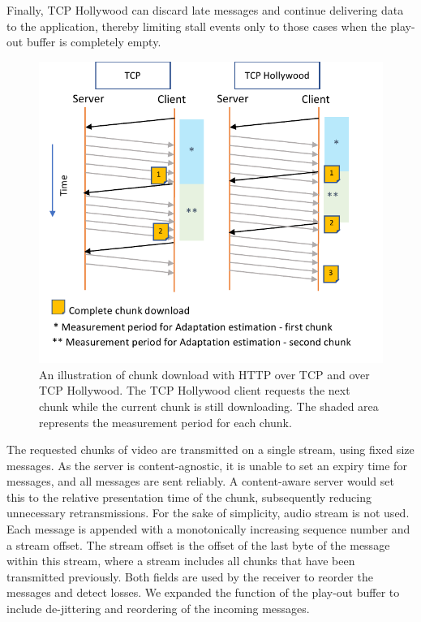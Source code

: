 Finally, TCP Hollywood can discard late messages and continue delivering data to the application, thereby limiting stall events only to those cases when the play-out buffer is completely
empty.

\begin{figure}
    \centering
    \includegraphics[width=\columnwidth]{figures/tcph-download.pdf}
    \caption{An illustration of chunk download with HTTP over TCP and over TCP Hollywood. The TCP Hollywood client requests the next chunk while the current chunk is still downloading. The shaded area represents the measurement period for each chunk. }
    \label{fig:hollywood_download}
\end{figure}

The requested chunks of video are transmitted on a single stream, using fixed size
messages. As the server is content-agnostic, it is unable to set an expiry time for messages, and
all messages are sent reliably. A content-aware server would set this to the relative presentation time of the chunk, subsequently reducing unnecessary retransmissions. For the sake of simplicity, audio stream is not used. Each message is appended with a monotonically increasing sequence number and a stream offset. The stream offset is the offset of the last byte of the message within this stream, where a stream includes all chunks that have been transmitted
previously. Both fields are used by the receiver to reorder the messages and detect
losses. We expanded the function of the play-out buffer to include de-jittering and
reordering of the incoming messages.

